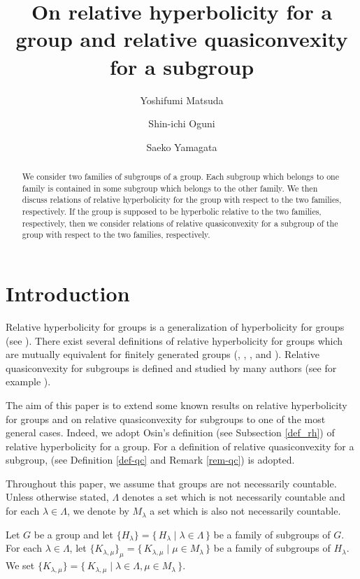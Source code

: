 \documentclass{amsart}
\title[On relative hyperbolicity for a group]
{On relative hyperbolicity for a group and relative quasiconvexity for a subgroup}
\author[Y. Matsuda]{Yoshifumi Matsuda}
\author[S. Oguni]{Shin-ichi Oguni}
\author[S. Yamagata]{Saeko Yamagata}
\theoremstyle{definition}
\begin{document}
\begin{abstract}
We consider two families of subgroups of a group. 
Each subgroup which belongs to one family is contained in some subgroup which belongs to the other family. 
We then discuss relations of relative hyperbolicity for the group with respect to the two families, respectively. 
If the group is supposed to be hyperbolic relative to the two families, respectively, then we consider relations of relative quasiconvexity for a subgroup of the group with respect to the two families, respectively. 
\end{abstract}

\maketitle

\section{Introduction}
Relative hyperbolicity for groups is a generalization of hyperbolicity for groups (see \cite{Gro87}). 
There exist several definitions of relative hyperbolicity for groups which are mutually equivalent for finitely generated groups (\cite{Bow12}, \cite{D-S05}, \cite{Far98}, \cite{Hru10} and \cite{Osi06}). 
Relative quasiconvexity for subgroups is defined and studied by many authors (see for example \cite{Hru10}). 

The aim of this paper is to extend some known results on relative hyperbolicity for groups and on relative quasiconvexity for subgroups to one of the most general cases. 
Indeed, we adopt Osin's definition \cite[Definition 2.35]{Osi06} (see Subsection \ref{def_rh}) of relative hyperbolicity for a group. 
For a definition of relative quasiconvexity for a subgroup, \cite[Definition 1.2]{M-O-Y1} (see Definition \ref{def-qc} and Remark \ref{rem-qc}) is adopted. 

Throughout this paper, we assume that groups are not necessarily countable. 
Unless otherwise stated, $\Lambda$ denotes a set which is not necessarily countable and for each $\lambda\in\Lambda$, we denote by $M_\lambda$ a set which is also not necessarily countable. 

Let $G$ be a group and let $\{H_\lambda \}=\{\, H_\lambda \mid \lambda \in \Lambda \,\}$ be a family of subgroups of $G$. 
For each $\lambda\in\Lambda$, let $\{K_{\lambda,\mu}\}_\mu=\{\, K_{\lambda, \mu} \mid \mu \in M_{\lambda}\, \}$ be a family of subgroups of $H_\lambda$. 
We set $\{K_{\lambda,\mu}\}=\{\, K_{\lambda, \mu}\mid \lambda\in\Lambda, \mu \in M_{\lambda}\,\}$. 
\end{document}

